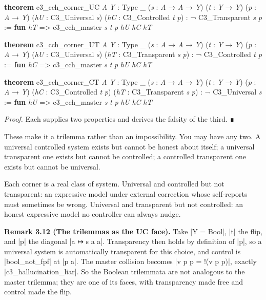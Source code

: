 \documentclass{memoir}
\begin{document}
\begin{LeanVerbatim}
\textbf{theorem} c3_cch_corner_UC \textit{A} \textit{Y} : Type _ (\textit{s} : \textit{A} → \textit{A} → \textit{Y})
    (\textit{t} : \textit{Y} → \textit{Y}) (\textit{p} : \textit{A} → \textit{Y})
    (\textit{hU} : C3_Universal \textit{s})
    (\textit{hC} : C3_Controlled \textit{t} \textit{p}) : ¬ C3_Transparent \textit{s} \textit{p} :=
  \textbf{fun} \textit{hT} => c3_cch_master \textit{s} \textit{t} \textit{p} \textit{hU} \textit{hC} \textit{hT}

\textbf{theorem} c3_cch_corner_UT \textit{A} \textit{Y} : Type _ (\textit{s} : \textit{A} → \textit{A} → \textit{Y})
    (\textit{t} : \textit{Y} → \textit{Y}) (\textit{p} : \textit{A} → \textit{Y})
    (\textit{hU} : C3_Universal \textit{s})
    (\textit{hT} : C3_Transparent \textit{s} \textit{p}) : ¬ C3_Controlled \textit{t} \textit{p} :=
  \textbf{fun} \textit{hC} => c3_cch_master \textit{s} \textit{t} \textit{p} \textit{hU} \textit{hC} \textit{hT}

\textbf{theorem} c3_cch_corner_CT \textit{A} \textit{Y} : Type _ (\textit{s} : \textit{A} → \textit{A} → \textit{Y})
    (\textit{t} : \textit{Y} → \textit{Y}) (\textit{p} : \textit{A} → \textit{Y})
    (\textit{hC} : C3_Controlled \textit{t} \textit{p})
    (\textit{hT} : C3_Transparent \textit{s} \textit{p}) : ¬ C3_Universal \textit{s} :=
  \textbf{fun} \textit{hU} => c3_cch_master \textit{s} \textit{t} \textit{p} \textit{hU} \textit{hC} \textit{hT}

\end{LeanVerbatim}


\emph{Proof.} Each supplies two properties and derives the falsity of the third. ∎

These make it a trilemma rather than an impossibility. You may have any two. A
universal controlled system exists but cannot be honest about itself; a
universal transparent one exists but cannot be controlled; a controlled
transparent one exists but cannot be universal.

Each corner is a real class of system. Universal and controlled but not
transparent: an expressive model under external correction whose self-reports
must sometimes be wrong. Universal and transparent but not controlled: an honest
expressive model no controller can always nudge.

\textbf{Remark 3.12 (The trilemmas as the UC face).} Take \LeanVerb|Y = Bool|, \LeanVerb|t| the flip, and \LeanVerb|p|
the diagonal \LeanVerb|a ↦ s a a|. Transparency then holds by definition of \LeanVerb|p|, so a
universal system is automatically transparent for this choice, and control is
\LeanVerb|bool_not_fpf| at \LeanVerb|p a|. The master collision becomes \LeanVerb|v p p = !(v p p)|,
exactly \LeanVerb|c3_hallucination_liar|. So the Boolean trilemmata are not
analogous to the master trilemma; they are one of its faces, with transparency
made free and control made the flip.
\end{document}
